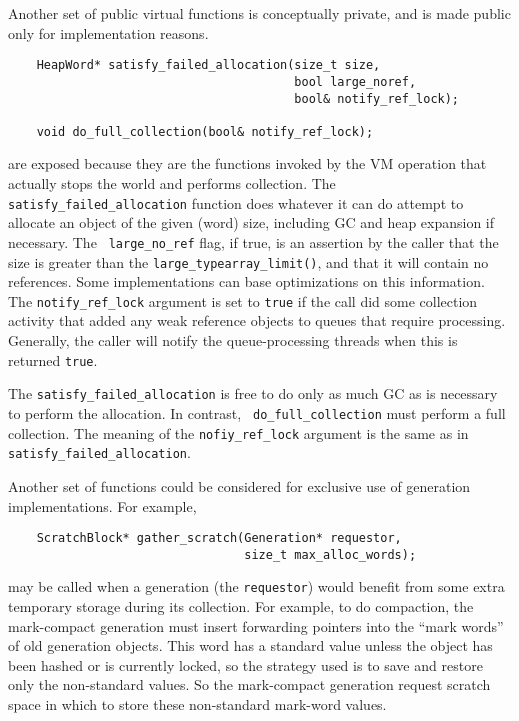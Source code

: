 \documentclass{article}
\begin{document}
Another set of public virtual functions is conceptually private, and
is made public only for implementation reasons.
\begin{verbatim}
    HeapWord* satisfy_failed_allocation(size_t size,
                                        bool large_noref,
                                        bool& notify_ref_lock);

    void do_full_collection(bool& notify_ref_lock);
\end{verbatim}
are exposed because they are the functions invoked by the VM operation
that actually stops the world and performs collection.
  The {\tt satisfy\_failed\_allocation} function does
whatever it can do attempt to allocate an object of the given (word)
size, including GC and heap expansion if necessary.  The {\tt
large\_no\_ref} flag, if true, is an assertion by the caller that 
the size is greater than the {\tt large\_typearray\_limit()}, and that
it will contain no references.  Some implementations can base
optimizations on this information.  The {\tt notify\_ref\_lock} argument
is set to {\tt true} if the call did some collection activity that
added any weak reference objects to queues that require processing.
Generally, the caller will notify the queue-processing threads when
this is returned {\tt true}.

The {\tt satisfy\_failed\_allocation} is free to do only as much GC as is
necessary to perform the allocation.  In contrast, {\tt
do\_full\_collection} must perform a full collection.  The meaning of
the {\tt nofiy\_ref\_lock} argument is the same as in {\tt
satisfy\_failed\_allocation}.

Another set of functions could be considered for exclusive use of
generation implementations.  For example,
\begin{verbatim}
    ScratchBlock* gather_scratch(Generation* requestor,
                                 size_t max_alloc_words);
\end{verbatim}
may be called when a generation (the {\tt requestor}) would benefit
from some extra temporary storage during its collection.  For
example, to do compaction, the mark-compact generation must insert
forwarding pointers into the ``mark words'' of old generation
objects.  This word has a standard value unless the object has been
hashed or is currently locked, so the strategy used is to save and
restore only the non-standard values.  So the mark-compact generation
request scratch space in which to store these non-standard mark-word
values.  
\end{document}

